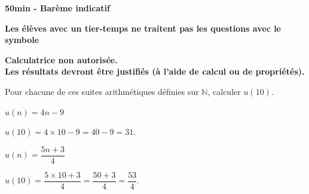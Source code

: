 \documentclass[11pt,a4paper]{article}  %
\begin{document}
	\graphicspath{{images/}}

	\begin{center}
	\end{center}

\begin{center}\textbf{50min - Barème indicatif}\end{center}
\begin{center}\textbf{Les élèves avec un tier-temps ne traitent pas les questions avec  le symbole }\end{center}
\begin{center}\textbf{Calculatrice non autorisée.\\Les résultats devront être justifiés (à l'aide de calcul ou de propriétés).}\end{center}


Pour chacune de ces suites arithmétiques définies sur $\mathbb{N}$, calculer $u(10)$.
\begin{enumMet}
	\item {} $u(n)=4 n-9$
	\par
	\begin{corrBox}
		$u(10)=4\times 10-9=40-9=31$.
	\end{corrBox}

	\item $u(n)=\dfrac{5 n+3}{4}$
	\par
	\begin{corrBox}
		$u(10)=\dfrac{5\times 10+3}{4}=\dfrac{50+3}{4}=\dfrac{53}{4}$.
	\end{corrBox}
\end{enumMet}
\end{document}

